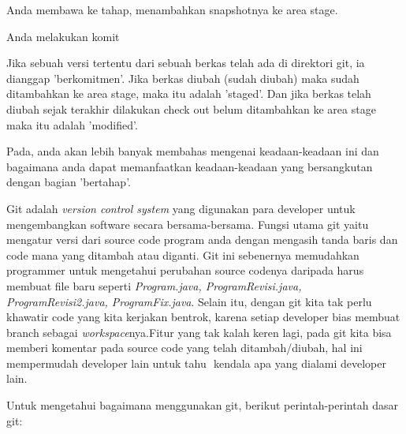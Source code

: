 \noindent 
 \hspace*{0.5in} Anda membawa ke tahap, menambahkan snapshotnya ke area stage. \par
\noindent 
 \hspace*{0.5in} Anda melakukan komit  \par
\noindent 
Jika sebuah versi tertentu dari sebuah berkas telah ada di direktori git, ia dianggap 'berkomitmen'. Jika berkas diubah (sudah diubah) maka sudah ditambahkan ke area stage, maka itu adalah 'staged'. Dan jika berkas telah diubah sejak terakhir dilakukan check out belum ditambahkan ke area stage maka itu adalah 'modified'. \par
\noindent 
Pada, anda akan lebih banyak membahas mengenai keadaan-keadaan ini dan bagaimana anda dapat memanfaatkan keadaan-keadaan yang bersangkutan dengan bagian 'bertahap'. \par
\noindent 
Git adalah $  $\textit{version control system} $  $yang digunakan para developer untuk mengembangkan software secara bersama-bersama. Fungsi utama git yaitu mengatur versi dari source code program anda dengan mengasih tanda baris dan code mana yang ditambah atau diganti.  Git ini sebenernya memudahkan programmer untuk mengetahui perubahan source codenya daripada harus membuat file baru seperti $  $\textit{Program.java, ProgramRevisi.java,}\textit{ }\textit{ProgramRevisi2.java, ProgramFix.java}. Selain itu, dengan git kita tak perlu khawatir code yang kita kerjakan bentrok, karena setiap developer bias membuat branch sebagai $  $\textit{workspace}nya.Fitur yang tak kalah keren lagi, pada git kita bisa memberi komentar pada source code yang telah ditambah/diubah, hal ini mempermudah developer lain untuk tahu $  $ kendala apa yang dialami developer lain. \par
\noindent 
Untuk mengetahui bagaimana menggunakan git, berikut perintah-perintah dasar git: \par
\noindent 
